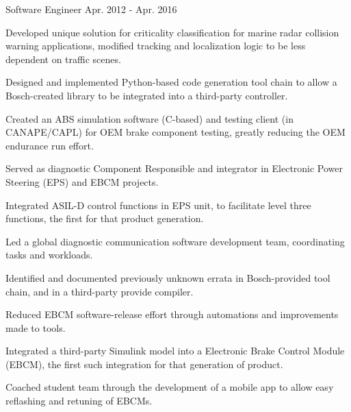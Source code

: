 \begin{cventries}
  \cventry
    {Software Engineer} %
    {} %
    {} %
    {Apr. 2012 - Apr. 2016} %
    {
      \begin{cvitems} %
        \item {Developed unique solution for criticality classification for marine radar collision warning applications, modified tracking and localization logic to be less dependent on traffic scenes.}
        \item {Designed and implemented Python-based code generation tool chain to allow a Bosch-created library to be integrated into a third-party controller.}
        \item {Created an ABS simulation software (C-based) and testing client (in CANAPE/CAPL) for OEM brake component testing, greatly reducing the OEM endurance run effort.}
        \item {Served as diagnostic Component Responsible and integrator in Electronic Power Steering (EPS) and EBCM projects.}
        \item {Integrated ASIL-D control functions in EPS unit, to facilitate level three functions, the first for that product generation.}
        \item {Led a global diagnostic communication software development team, coordinating tasks and workloads.}
        \iflongform     
        \item {Identified and documented previously unknown errata in Bosch-provided tool chain, and in a third-party provide compiler.}
        \item {Reduced EBCM software-release effort through automations and improvements made to tools.}
        \item {Integrated a third-party Simulink model into a Electronic Brake Control Module (EBCM), the first such integration for that generation of product.}
        \item {Coached student team through the development of a mobile app to allow easy reflashing and retuning of EBCMs.}
        \fi
      \end{cvitems}
    }
\end{cventries}
